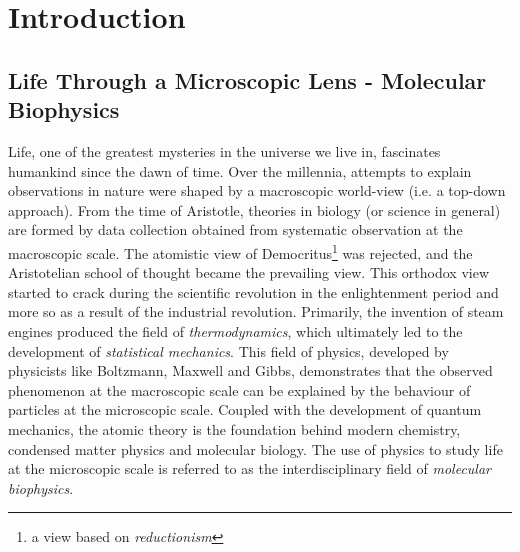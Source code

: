 \chapter{Introduction}
\setcounter{page}{1}
\label{chap:intro}

\section{Life Through a Microscopic Lens - Molecular Biophysics}

\vskip 0.5cm

Life, one of the greatest mysteries in the universe we live in, fascinates humankind since 
the dawn of time. Over the millennia, attempts to explain observations in nature were shaped 
by a macroscopic world-view (i.e. a top-down approach). From the time of Aristotle, theories 
in biology (or science in general) are formed by data collection obtained from systematic 
observation at the macroscopic scale. The atomistic view of Democritus\footnote{a view based 
on \textit{reductionism}} was rejected, and the Aristotelian school of thought became the 
prevailing view. This orthodox view started to crack during the scientific revolution in the 
enlightenment period and more so as a result of the industrial revolution. Primarily, the 
invention of steam engines produced the field of \textit{thermodynamics}, which ultimately 
led to the development of \textit{statistical mechanics}. This field of physics, developed by 
physicists like Boltzmann, Maxwell and Gibbs, demonstrates that the observed phenomenon at the 
macroscopic scale can be explained by the behaviour of particles at the microscopic scale. 
Coupled with the development of quantum mechanics, the atomic theory is the foundation behind 
modern chemistry, condensed matter physics and molecular biology. The use of physics to study 
life at the microscopic scale is referred to as the interdisciplinary field of \textit{molecular 
biophysics}.

